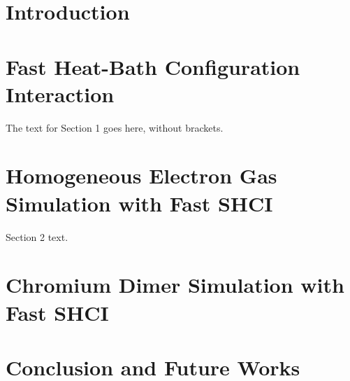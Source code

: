 \documentclass[phd,tocprelim]{cornell}
\begin{document}
\normalspacing \setcounter{page}{1} 
\pagestyle{cornell} \addtolength{\parskip}{0.5\baselineskip}

\chapter{Introduction}

\chapter{Fast Heat-Bath Configuration Interaction}
The text for Section 1 goes here, without brackets.

\chapter{Homogeneous Electron Gas Simulation with Fast SHCI}
Section 2 text.

\chapter{Chromium Dimer Simulation with Fast SHCI }



\chapter{Conclusion and Future Works}


\end{document}

